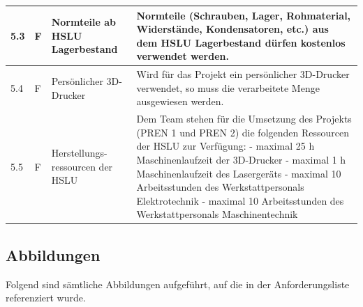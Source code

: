 \documentclass[../main.tex]{subfiles}
\begin{document}
\begin{tabular}{|l|p{0.5cm}|p{4cm}|p{10cm}|}
  \hline
  5.3          & F          & Normteile ab HSLU Lagerbestand   & Normteile (Schrauben, Lager, Rohmaterial, Widerstände, Kondensatoren, etc.) aus dem HSLU Lagerbestand dürfen kostenlos verwendet werden.                                                                                                                                                                                                                                                      \\
  \hline
  5.4          & F          & Persönlicher 3D-Drucker          & Wird für das Projekt ein persönlicher 3D-Drucker verwendet, so muss die verarbeitete Menge ausgewiesen werden.                                                                                                                                                                                                                                                                                \\
  \hline
  5.5          & F          & Herstellungs-ressourcen der HSLU & Dem Team stehen für die Umsetzung des Projekts (PREN 1 und PREN 2) die folgenden Ressourcen der HSLU zur Verfügung: \newline - maximal 25 h Maschinenlaufzeit der 3D-Drucker \newline - maximal 1 h Maschinenlaufzeit des Lasergeräts \newline - maximal 10 Arbeitsstunden des Werkstattpersonals Elektrotechnik \newline - maximal 10 Arbeitsstunden des Werkstattpersonals Maschinentechnik \\
  \hline
\end{tabular}

\newpage

\subsection{Abbildungen}
Folgend sind sämtliche Abbildungen aufgeführt, auf die in der Anforderungsliste
referenziert wurde.
\end{document}

